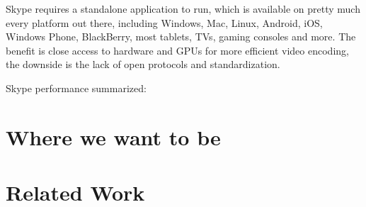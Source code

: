 Skype requires a standalone application to run, which is available on pretty much every platform out there, including Windows, Mac, Linux, Android, iOS, Windows Phone, BlackBerry, most tablets, TVs, gaming consoles and more. The benefit is close access to hardware and GPUs for more efficient video encoding, the downside is the lack of open protocols and standardization.

Skype performance summarized:






\section{Where we want to be}



\section{Related Work}


